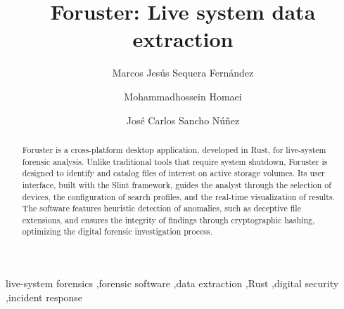 \documentclass[preprint,12pt, a4paper]{elsarticle}
\begin{document}
\renewcommand{\labelenumii}{\arabic{enumi}.\arabic{enumii}}

\begin{frontmatter}


\title{Foruster: Live system data extraction}


\author[label1]{Marcos Jesús Sequera Fernández}
\author[label2]{Mohammadhossein Homaei}
\author[label3]{José Carlos Sancho Núñez}
\address[label1]{marcosjesus@unex.es}
\address[label2]{mhomaein@alumnos.unex.es}
\address[label3]{jcsanchon@unex.es}

\begin{abstract}
Foruster is a cross-platform desktop application, developed in Rust, for live-system forensic analysis. Unlike traditional tools that require system shutdown, Foruster is designed to identify and catalog files of interest on active storage volumes. Its user interface, built with the Slint framework, guides the analyst through the selection of devices, the configuration of search profiles, and the real-time visualization of results. The software features heuristic detection of anomalies, such as deceptive file extensions, and ensures the integrity of findings through cryptographic hashing, optimizing the digital forensic investigation process.
\end{abstract}

\begin{keyword}
live-system forensics \sep forensic software \sep data extraction \sep Rust \sep digital security \sep incident response



\end{keyword}

\end{frontmatter}
\end{document}
